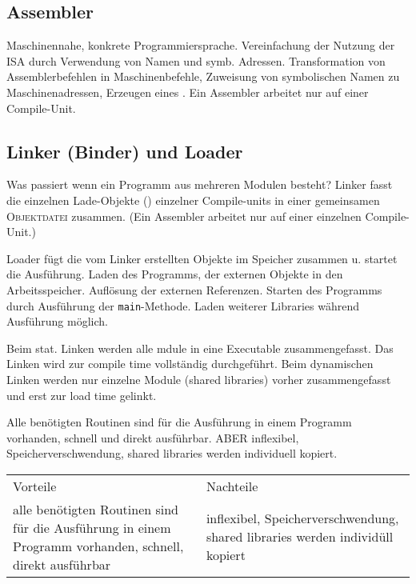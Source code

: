 \subsection{Assembler}
Maschinennahe, konkrete Programmiersprache. Vereinfachung der Nutzung der ISA durch Verwendung von Namen und symb. Adressen. 
Transformation von Assemblerbefehlen in Maschinenbefehle, Zuweisung von symbolischen Namen zu Maschinenadressen, Erzeugen eines . Ein Assembler arbeitet nur auf einer Compile-Unit. 

\subsection{Linker (Binder) und Loader}
Was passiert wenn ein Programm aus mehreren Modulen besteht?
Linker fasst die einzelnen Lade-Objekte () einzelner Compile-units in einer gemeinsamen \textsc{Objektdatei} zusammen. (Ein Assembler arbeitet nur auf einer einzelnen Compile-Unit.) 

Loader fügt die vom Linker erstellten Objekte im Speicher zusammen u. startet die Ausführung. Laden des Programms, der externen Objekte in den Arbeitsspeicher. Auflösung der externen Referenzen. Starten des Programms durch Ausführung der \texttt{main}-Methode. Laden weiterer Libraries während Ausführung möglich. 

Beim stat. Linken werden alle mdule in eine Executable zusammengefasst. Das Linken wird zur compile time vollständig durchgeführt. Beim dynamischen Linken werden nur einzelne Module (shared libraries) vorher zusammengefasst und erst zur load time gelinkt. 

Alle benötigten Routinen sind für die Ausführung in einem Programm vorhanden, schnell und direkt ausführbar. ABER inflexibel, Speicherverschwendung, shared libraries werden individuell kopiert. 

\begin{tabularx}{\textwidth}{X X}
	Vorteile& Nachteile\\
	alle benötigten Routinen sind für die Ausführung in einem Programm vorhanden, schnell, direkt ausführbar& inflexibel, Speicherverschwendung, shared libraries werden individüll kopiert\\ 
\end{tabularx}
